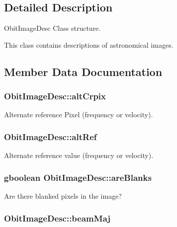 \subsection{Detailed Description}
Obit\-Image\-Desc Class structure. 

This class contains descriptions of astronomical images. 



\subsection{Member Data Documentation}
\subsubsection{ {\bf Obit\-Image\-Desc::alt\-Crpix}}\label{structObitImageDesc_o11}


Alternate reference Pixel (frequency or velocity). 

\subsubsection{ {\bf Obit\-Image\-Desc::alt\-Ref}}\label{structObitImageDesc_o30}


Alternate reference value (frequency or velocity). 

\subsubsection{\setlength{\rightskip}{0pt plus 5cm}gboolean {\bf Obit\-Image\-Desc::are\-Blanks}}\label{structObitImageDesc_o34}


Are there blanked pixels in the image? 

\subsubsection{ {\bf Obit\-Image\-Desc::beam\-Maj}}\label{structObitImageDesc_o14}


